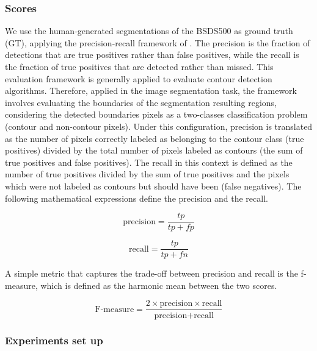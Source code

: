 \subsubsection{Scores}
We use the human-generated segmentations of the BSDS500 as ground truth (GT), applying the precision-recall framework of \cite{Martin.Fowlkes.ea:PAMI:2004}. The precision is the fraction of detections that are true positives rather than false positives, while the recall is the fraction of true positives that are detected rather than missed. This evaluation framework is generally applied to evaluate contour detection algorithms. Therefore, applied in the image segmentation task, the framework involves evaluating the boundaries of the segmentation resulting regions, considering the detected boundaries pixels as a two-classes classification problem (contour and non-contour pixels). Under this configuration, precision is translated as the number of pixels correctly labeled as belonging to the contour class (true positives) divided by the total number of pixels labeled as contours (the sum of true positives and false positives). The recall in this context is defined as the number of true positives divided by the sum of true positives and the pixels which were not labeled as contours but should have been (false negatives). The following mathematical expressions define the precision and the recall.

\begin{equation}\label{eq:precision_score}
    \text{precision} = \frac{tp}{tp+fp}
\end{equation}

\begin{equation}\label{eq:recall_score}
    \text{recall} = \frac{tp}{tp+fn}
\end{equation}

A simple metric that captures the trade-off between precision and recall is the f-measure, which is defined as the harmonic mean between the two scores.

\begin{equation}\label{eq:f_score}
    \text{F-measure} = \frac{2 \times \text{precision}\times\text{recall}}{\text{precision} + \text{recall}}
\end{equation}


\subsubsection{Experiments set up}

